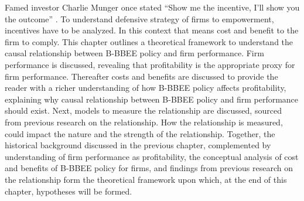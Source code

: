 Famed investor Charlie Munger once stated “Show me the incentive, I’ll show you the outcome” \cite[]{N59}. To understand defensive strategy of firms to empowerment, incentives have to be analyzed. In this context that means cost and benefit to the firm to comply. This chapter outlines a theoretical framework to understand the causal relationship between B-BBEE policy and firm performance. Firm performance is discussed, revealing that profitability is the appropriate proxy for firm performance. Thereafter costs and benefits are discussed to provide the reader with a richer understanding of how B-BBEE policy affects profitability, explaining why causal relationship between B-BBEE policy and firm performance should exist. Next, models to measure the relationship are discussed, sourced from previous research on the relationship. How the relationship is measured, could impact the nature and the strength of the relationship. Together, the historical background discussed in the previous chapter, complemented by understanding of firm performance as profitability, the conceptual analysis of cost and benefits of B-BBEE policy for firms, and findings from previous research on the relationship form the theoretical framework upon which, at the end of this chapter, hypotheses will be formed.

